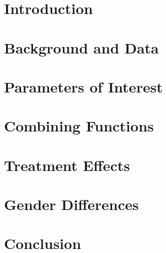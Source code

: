 \section{Introduction}
\label{sec:introduction}
	

\section{Background and Data}
\label{sec:data}


\section{Parameters of Interest}
\label{sec:parameters}


\section{Combining Functions}
\label{sec:combining-functions}


\section{Treatment Effects}
\label{sec:treatment-effects}


\section{Gender Differences}
\label{sec:gender-differences}


\section{Conclusion}
\label{sec:conclusion}


\clearpage
\singlespacing




